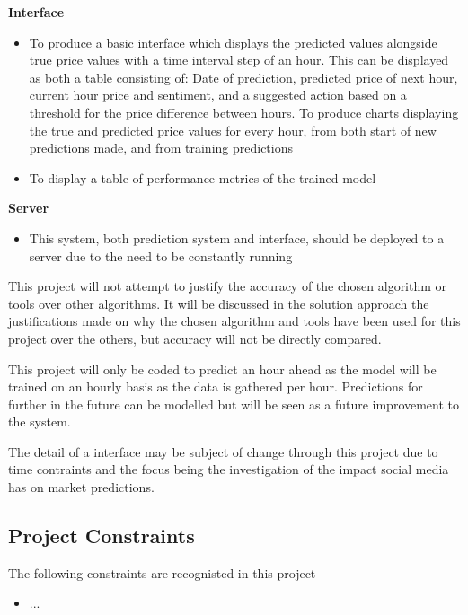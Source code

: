 \documentclass[oneside, 10pt]{article}
\begin{document}
		\textbf{Interface}
		\begin{itemize}
			\item To produce a basic interface which displays the predicted values alongside true price values with a time interval step of an hour. This can be displayed as both a table consisting of: 
			\subitem Date of prediction, predicted price of next hour, current hour price and sentiment, and a suggested action based on a threshold for the price difference between hours.
			\subitem To produce charts displaying the true and predicted price values for every hour, from both start of new predictions made, and from training predictions
			\item To display a table of performance metrics of the trained model
			\newline
		\end{itemize}
	
		\textbf{Server}
		\begin{itemize}
			\item This system, both prediction system and interface, should be deployed to a server due to the need to be constantly running
		\end{itemize}
		
		This project will not attempt to justify the accuracy of the chosen algorithm or tools over other algorithms. It will be discussed in the solution approach the justifications made on why the chosen algorithm and tools have been used for this project over the others, but accuracy will not be directly compared.
		
		This project will only be coded to predict an hour ahead as the model will be trained on an hourly basis as the data is gathered per hour. Predictions for further in the future can be modelled but will be seen as a future improvement to the system.
		
		The detail of a interface may be subject of change through this project due to time contraints and the focus being the investigation of the impact social media has on market predictions.
		
		\subsection{Project Constraints}\label{constraints}
		The following constraints are recognisted in this project
		
		\begin{itemize}
			\item ...
		\end{itemize}
		
\end{document}
